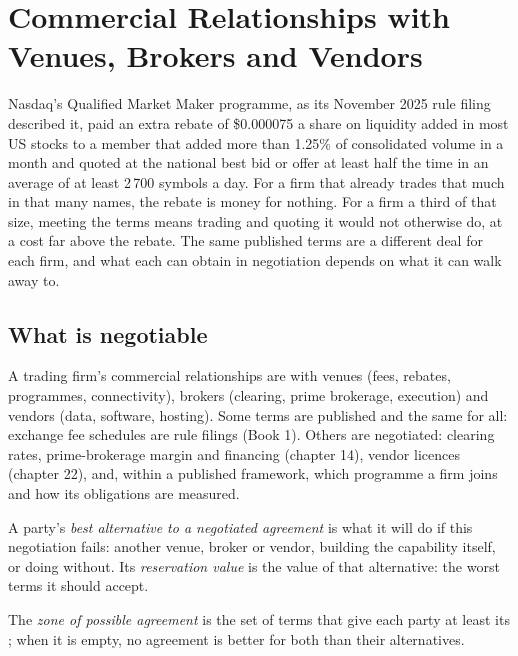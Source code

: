 \chapter{Commercial Relationships with Venues, Brokers and Vendors}\label{ch:fm:commercial-relationships-with-venues-brokers-and-vendors}

Nasdaq's Qualified Market Maker programme, as its November 2025 rule filing described it, paid an extra rebate of \$0.000075 a share on liquidity
added in most US stocks to a member that added more than 1.25\% of consolidated volume in a month and quoted at the national best bid or offer at
least half the time in an average of at least 2\,700 symbols a day. For a firm that already trades that much in that many names, the rebate is
money for nothing. For a firm a third of that size, meeting the terms means trading and quoting it would not otherwise do, at a cost far above the
rebate. The same published terms are a different deal for each firm, and what each can obtain in negotiation depends on what it can walk away to.

\section{What is negotiable}

A trading firm's commercial relationships are with venues (fees, rebates, programmes, connectivity), brokers (clearing, prime brokerage,
execution) and vendors (data, software, hosting). Some terms are published and the same for all: exchange fee schedules are rule filings (Book 1).
Others are negotiated: clearing rates, prime-brokerage margin and financing (chapter 14), vendor licences (chapter 22), and, within a published
framework, which programme a firm joins and how its obligations are measured.

\begin{definition}\label{def:fm:commercial-relationships-with-venues-brokers-and-vendors:batna}
A party's \emph{best alternative to a negotiated agreement} is what it will do if this
negotiation fails: another venue, broker or vendor, building the capability itself, or doing without. Its \emph{reservation
value} is the value of that alternative: the worst terms it should accept.
\end{definition}

\begin{definition}\label{def:fm:commercial-relationships-with-venues-brokers-and-vendors:zopa}
The \emph{zone of possible agreement} is the set of terms that give each party at least its ;
when it is empty, no agreement is better for both than their alternatives.
\end{definition}


